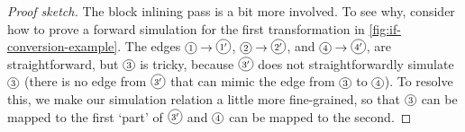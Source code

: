 \begin{theorem}
\begin{proof}[Proof sketch]
The block inlining pass is a bit more involved.  To see why, consider how to
prove a forward simulation for the first transformation in
\cref{fig:if-conversion-example}. The edges
$\diaglabel{$1$}\rightarrow\diaglabel{$1^\prime$}$,
$\diaglabel{$2$}\rightarrow\diaglabel{$2^\prime$}$, and
$\diaglabel{$4$}\rightarrow\diaglabel{$4^\prime$}$, are straightforward, but
$\diaglabel{$3$}$ is tricky, because $\diaglabel{$3^\prime$}$ does not
straightforwardly simulate $\diaglabel{$3$}$ (there is no edge from
$\diaglabel{$3^\prime$}$ that can mimic the edge from $\diaglabel{$3$}$ to
$\diaglabel{$4$}$). To resolve this, we make our simulation relation a little
more fine-grained, so that $\diaglabel{$3$}$ can be mapped to the first `part'
of $\diaglabel{$3^\prime$}$ and $\diaglabel{$4$}$ can be mapped to the
second.

  \end{proof}
\end{theorem}

